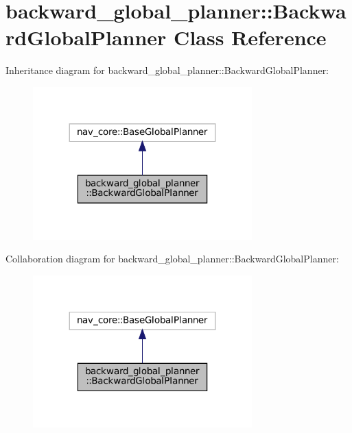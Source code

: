 \hypertarget{classbackward__global__planner_1_1BackwardGlobalPlanner}{}\section{backward\+\_\+global\+\_\+planner\+:\+:Backward\+Global\+Planner Class Reference}
\label{classbackward__global__planner_1_1BackwardGlobalPlanner}


Inheritance diagram for backward\+\_\+global\+\_\+planner\+:\+:Backward\+Global\+Planner\+:
\nopagebreak
\begin{figure}[H]
\begin{center}
\leavevmode
\includegraphics[width=239pt]{classbackward__global__planner_1_1BackwardGlobalPlanner__inherit__graph}
\end{center}
\end{figure}


Collaboration diagram for backward\+\_\+global\+\_\+planner\+:\+:Backward\+Global\+Planner\+:
\nopagebreak
\begin{figure}[H]
\begin{center}
\leavevmode
\includegraphics[width=239pt]{classbackward__global__planner_1_1BackwardGlobalPlanner__coll__graph}
\end{center}
\end{figure}
